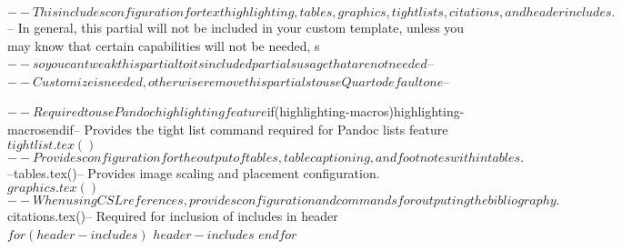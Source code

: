 $-- This includes configuration for text highlighting, tables, graphics, tight lists, citations, and header includes. 
$-- In general, this partial will not be included in your custom template, unless you may know that certain capabilities will not be needed, s
$-- so you can tweak this partial to its included partials usage that are not needed

$-- %
$-- Customize is needed, otherwise remove this partials to use Quarto default one
$-- %

$-- Required to use Pandoc highlighting feature
$if(highlighting-macros)$
$highlighting-macros$
$endif$

$-- Provides the tight list command required for Pandoc lists feature
$tightlist.tex()$
$-- Provides configuration for the output of tables, table captioning, and footnotes within tables.
$--tables.tex()$ 
$-- Provides image scaling and placement configuration.
$graphics.tex()$
$-- When using CSL references, provides configuration and commands for outputing the bibliography.
$citations.tex()$

$-- Required for inclusion of includes in header
$for(header-includes)$
$header-includes$
$endfor$
